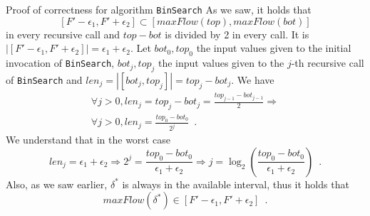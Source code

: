 \begin{sepproof}{Proof of correctness for algorithm \texttt{BinSearch}}
  As we saw, it holds that
  \begin{equation*}
    \left[F' - \epsilon_1, F' + \epsilon_2\right] \subset \left[maxFlow\left(top\right), maxFlow\left(bot\right)\right]
  \end{equation*}
  in every recursive call and $top - bot$ is divided by 2 in every call.
  It is $|[F' - \epsilon_1, F' + \epsilon_2]| = \epsilon_1 + \epsilon_2$. Let
  $bot_0, top_0$ the input values given to the initial invocation of \texttt{BinSearch}, $bot_j,top_j$ the input
  values given to the $j$-th recursive call of \texttt{BinSearch} and $len_j =|[bot_j, top_j]| = top_j - bot_j$. We have
  \begin{equation*}
  \begin{gathered}
    \forall j > 0, len_j = top_j - bot_j = \frac{top_{j-1} - bot_{j-1}}{2} \Rightarrow \\
    \forall j >0, len_j = \frac{top_0 - bot_0}{2^j} \enspace.
  \end{gathered}
  \end{equation*}
  We understand that in the worst case
  \begin{equation*}
    len_j = \epsilon_1 + \epsilon_2 \Rightarrow 2^j = \frac{top_0-bot_0}{\epsilon_1 + \epsilon_2} \Rightarrow
    j = \log_2(\frac{top_0-bot_0}{\epsilon_1+\epsilon_2}) \enspace.
  \end{equation*}
  Also, as we saw earlier, $\delta^*$ is always in the available interval, thus it holds that
  \begin{equation*}
    maxFlow\left(\delta^*\right) \in \left[F' - \epsilon_1, F' + \epsilon_2\right] \enspace.
  \end{equation*}
\end{sepproof}
